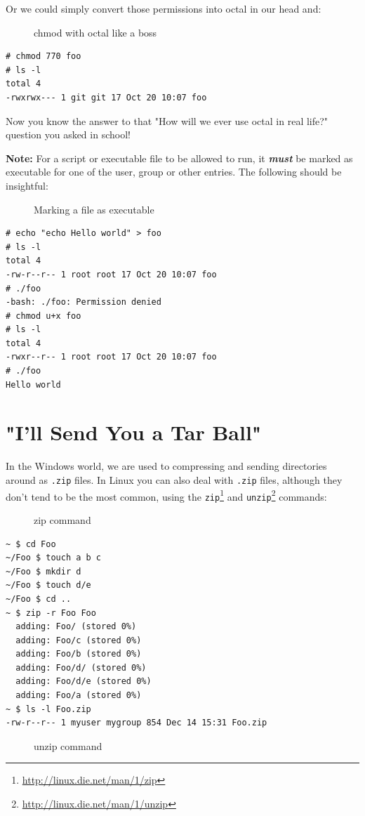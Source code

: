 \documentclass[10pt,]{book}
\renewcommand{\href}[2]{#2\footnote{\url{#1}}}
\numberwithin{figure}{chapter}
\DeclareRobustCommand{\drcap}[1]{\begin{figure}[H]\caption{#1}\end{figure}}
\DeclareRobustCommand{\drcmd}[1]{\index{Commands!#1}}
\begin{document}
Or we could simply convert those permissions into octal in our head and:

\drcap{chmod with octal like a boss}

\begin{verbatim}
# chmod 770 foo
# ls -l
total 4
-rwxrwx--- 1 git git 17 Oct 20 10:07 foo
\end{verbatim}

Now you know the answer to that "How will we ever use octal in real
life?" question you asked in school!

\textbf{Note:} For a script or executable file to be allowed to run, it
\textbf{\emph{must}} be marked as executable for one of the user, group
or other entries. The following should be insightful:

\drcap{Marking a file as executable}

\begin{verbatim}
# echo "echo Hello world" > foo
# ls -l
total 4
-rw-r--r-- 1 root root 17 Oct 20 10:07 foo
# ./foo
-bash: ./foo: Permission denied
# chmod u+x foo
# ls -l
total 4
-rwxr--r-- 1 root root 17 Oct 20 10:07 foo
# ./foo
Hello world
\end{verbatim}

\section*{"I'll Send You a Tar Ball"}\label{ill-send-you-a-tar-ball}

In the Windows world, we are used to compressing and sending directories
around as \texttt{.zip} files. In Linux you can also deal with
\texttt{.zip} files, although they don't tend to be the most common,
using the \href{http://linux.die.net/man/1/zip}{\texttt{zip}}\drcmd{zip}
and \href{http://linux.die.net/man/1/unzip}{\texttt{unzip}}\drcmd{unzip}
commands:

\drcap{zip command}

\begin{verbatim}
~ $ cd Foo
~/Foo $ touch a b c
~/Foo $ mkdir d
~/Foo $ touch d/e
~/Foo $ cd ..
~ $ zip -r Foo Foo
  adding: Foo/ (stored 0%)
  adding: Foo/c (stored 0%)
  adding: Foo/b (stored 0%)
  adding: Foo/d/ (stored 0%)
  adding: Foo/d/e (stored 0%)
  adding: Foo/a (stored 0%)
~ $ ls -l Foo.zip
-rw-r--r-- 1 myuser mygroup 854 Dec 14 15:31 Foo.zip
\end{verbatim}

\drcap{unzip command}
\end{document}
